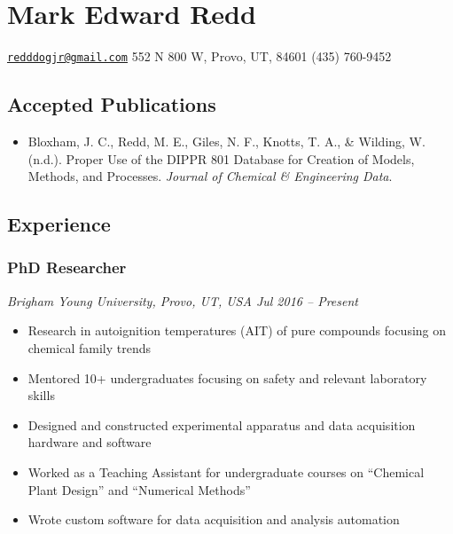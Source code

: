
\hypertarget{mark-edward-redd}{%
\section{Mark Edward Redd}\label{mark-edward-redd}}

\href{mailto:redddogjr@gmail.com}{\nolinkurl{redddogjr@gmail.com}}
\textbar{} 552 N 800 W, Provo, UT, 84601 \textbar{} (435) 760-9452


\hypertarget{accepted-publications}{%
\subsection{Accepted Publications}\label{accepted-publications}}


\begin{itemize}
\tightlist
\item
  Bloxham, J. C., Redd, M. E., Giles, N. F., Knotts, T. A., \& Wilding,
  W. (n.d.). Proper Use of the DIPPR 801 Database for Creation of
  Models, Methods, and Processes. \emph{Journal of Chemical \&
  Engineering Data}.
\end{itemize}

\hypertarget{experience}{%
\subsection{Experience}\label{experience}}

\hypertarget{phd-researcher}{%
\subsubsection{PhD Researcher}\label{phd-researcher}}

\emph{Brigham Young University, Provo, UT, USA \textbar{} Jul 2016 --
Present}

\begin{itemize}
\tightlist
\item
  Research in autoignition temperatures (AIT) of pure compounds focusing
  on chemical family trends
\item
  Mentored 10+ undergraduates focusing on safety and relevant laboratory
  skills
\item
  Designed and constructed experimental apparatus and data acquisition
  hardware and software
\item
  Worked as a Teaching Assistant for undergraduate courses on ``Chemical
  Plant Design'' and ``Numerical Methods''
\item
  Wrote custom software for data acquisition and analysis automation
\end{itemize}

